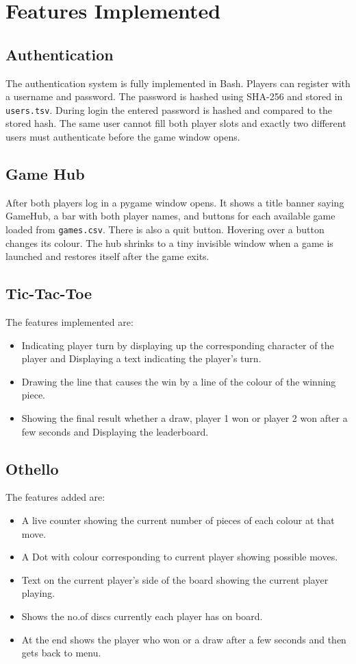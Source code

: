 \documentclass[12pt,a4paper]{article}
\begin{document}
\section{Features Implemented}
\label{sec:features}

\subsection{Authentication}
The authentication system is fully implemented in Bash. Players can register with a username and password. The password is hashed using SHA-256 and stored in \texttt{users.tsv}. During login the entered password is hashed and compared to the stored hash. The same user cannot fill both player slots and exactly two different users must authenticate before the game window opens.

\subsection{Game Hub}
After both players log in a pygame window opens. It shows a title banner saying GameHub, a bar with both player names, and buttons for each available game loaded from \texttt{games.csv}. There is also a quit button. Hovering over a button changes its colour. The hub shrinks to a tiny invisible window when a game is launched and restores itself after the game exits.

\subsection{Tic-Tac-Toe}
The features implemented are:
\begin{itemize}
    \item Indicating player turn by displaying up the corresponding character of the player and Displaying a text indicating the player's turn.
    \item Drawing the line that causes the win by a line of the colour of the winning piece.
    \item Showing the final result whether a draw, player 1 won or player 2 won after a few seconds and Displaying the leaderboard.
\end{itemize}

\subsection{Othello}
The features added are:
\begin{itemize}
    \item A live counter showing the current number of pieces of each colour at that move.
    \item A Dot with colour corresponding to current player showing possible moves.
    \item Text on the current player's side of the board showing the current player playing.
    \item Shows the no.of discs currently each player has on board.
    \item At the end shows the player who won or a draw after a few seconds and then gets back to menu.
\end{itemize}
\end{document}
